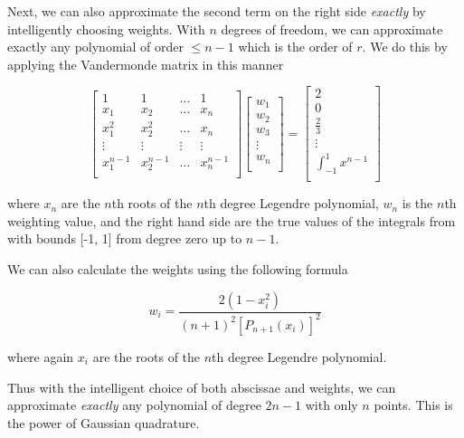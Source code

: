 Next, we can also approximate the second term on the right side \textit{exactly} by intelligently choosing weights.  With $n$ degrees of freedom, we can approximate exactly any polynomial of order $\leq n-1$ which is the order of $r$.  We do this by applying the Vandermonde matrix in this manner

\begin{equation}
\begin{bmatrix}
1    & 1 &  \dots &1 \\
x_1      & x_2 &  \dots & x_n \\
x_1^2      & x_2^2 & \dots & x_n \\
\vdots & \vdots & \vdots & \vdots\\
x_1^{n-1}      & x_2^{n-1} & \dots & x_n^{n-1}\\
\end{bmatrix}
\begin{bmatrix}
w_1 \\
w_2 \\
w_3 \\
\vdots \\
w_n \\
\end{bmatrix}
=
\begin{bmatrix}
2  \\
0  \\
\frac{2}{3}  \\
\vdots \\
\int_{-1}^1 x^{n-1}  \\
\end{bmatrix}
\end{equation}

where $x_{n}$ are the $n$th roots of the $n$th degree Legendre polynomial, $w_n$ is the $n$th weighting value, and the right hand side are the true values of the integrals from with bounds [-1, 1] from degree zero up to $n-1$.

We can also calculate the weights using the following formula

\begin{equation} w_i = \frac{2(1-x_i^2)}{(n+1)^2 [P_{n+1}(x_i)]^2 } \end{equation}

where again $x_i$ are the roots of the $n$th degree Legendre polynomial.

Thus with the intelligent choice of both abscissae and weights, we can approximate \textit{exactly} any polynomial of degree $2n-1$ with only $n$ points. This is the power of Gaussian quadrature.

